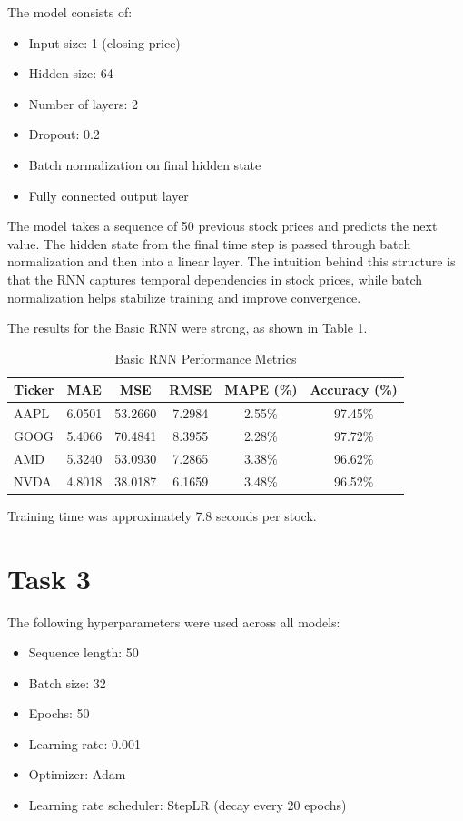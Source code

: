 \documentclass{article}
\begin{document}
The model consists of:
\begin{itemize}
\item Input size: 1 (closing price)
\item Hidden size: 64
\item Number of layers: 2
\item Dropout: 0.2
\item Batch normalization on final hidden state
\item Fully connected output layer
\end{itemize}

The model takes a sequence of 50 previous stock prices and predicts the next value. The hidden state from the final time step is passed through batch normalization and then into a linear layer. The intuition behind this structure is that the RNN captures temporal dependencies in stock prices, while batch normalization helps stabilize training and improve convergence.

The results for the Basic RNN were strong, as shown in Table 1.
\begin{table}[h]
    \centering
    \caption{Basic RNN Performance Metrics}
    \begin{tabular}{lccccc}
        \toprule
        Ticker & MAE & MSE & RMSE & MAPE (\%) & Accuracy (\%) \\
        \midrule
        AAPL & 6.0501 & 53.2660 & 7.2984 & 2.55\% & 97.45\% \\
        GOOG & 5.4066 & 70.4841 & 8.3955 & 2.28\% & 97.72\% \\
        AMD  & 5.3240 & 53.0930 & 7.2865 & 3.38\% & 96.62\% \\
        NVDA & 4.8018 & 38.0187 & 6.1659 & 3.48\% & 96.52\% \\
        \bottomrule
    \end{tabular}
\end{table}

Training time was approximately 7.8 seconds per stock.

\section{Task 3}

The following hyperparameters were used across all models:
\begin{itemize}
\item Sequence length: 50
\item Batch size: 32
\item Epochs: 50
\item Learning rate: 0.001
\item Optimizer: Adam
\item Learning rate scheduler: StepLR (decay every 20 epochs)
\end{itemize}
\end{document}
